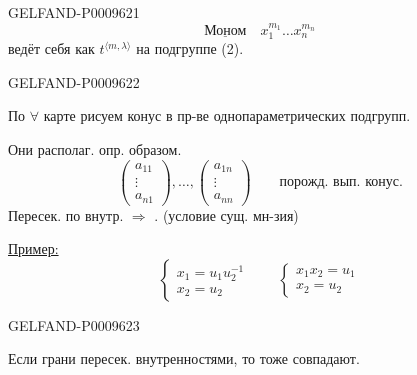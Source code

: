 \begin{GelfandAdjacentEvidence}{GELFAND-P000962}{1}
\begin{equation*}
 \underline{\text{Моном}}\quad x_1^{m_1}\ldots x_n^{m_n}\tag{3}
\end{equation*}
ведёт себя как $t^{\langle m,\lambda\rangle}$ на подгруппе (2).
\end{GelfandAdjacentEvidence}
\begin{GelfandAdjacentEvidence}{GELFAND-P000962}{2}


По $\forall$ карте рисуем конус в пр-ве однопараметрических подгрупп.

Они располаг. опр. образом.
\[
 \begin{pmatrix}a_{11}\\ \vdots\\ a_{n1}\end{pmatrix},\ldots,
 \begin{pmatrix}a_{1n}\\ \vdots\\ a_{nn}\end{pmatrix}
 \qquad\text{порожд. вып. конус.}
\]
Пересек. по внутр. $\Rightarrow$ . (условие сущ. мн-зия)

\underline{Пример:}
\[
 \begin{cases}
 x_1=u_1u_2^{-1}\\
 x_2=u_2
 \end{cases}
 \qquad
 \begin{cases}
 x_1x_2=u_1\\
 x_2=u_2
 \end{cases}
\]

\end{GelfandAdjacentEvidence}
\begin{GelfandAdjacentEvidence}{GELFAND-P000962}{3}


Если грани пересек. внутренностями, то тоже совпадают.
\end{GelfandAdjacentEvidence}
